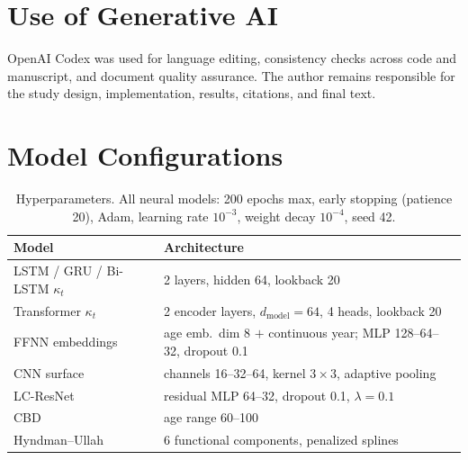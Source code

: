 \documentclass[11pt,a4paper]{article}
\begin{document}
\section*{Use of Generative AI}
OpenAI Codex was used for language editing, consistency checks across code and manuscript, and document quality assurance. The author remains responsible for the study design, implementation, results, citations, and final text.




\appendix

\section{Model Configurations}
\label{app:configs}

\begin{table}[htbp]
\centering
\caption{Hyperparameters. All neural models: 200 epochs max, early stopping (patience 20), Adam, learning rate $10^{-3}$, weight decay $10^{-4}$, seed 42.}
\label{tab:hyper}
\small
\begin{tabular}{l l}
\toprule
Model & Architecture \\
\midrule
LSTM / GRU / Bi-LSTM $\kappa_t$ & 2 layers, hidden 64, lookback 20 \\
Transformer $\kappa_t$ & 2 encoder layers, $d_{\text{model}}{=}64$, 4 heads, lookback 20 \\
FFNN embeddings & age emb.\ dim 8 $+$ continuous year; MLP 128--64--32, dropout 0.1 \\
CNN surface & channels 16--32--64, kernel $3{\times}3$, adaptive pooling \\
LC-ResNet & residual MLP 64--32, dropout 0.1, $\lambda = 0.1$ \\
CBD & age range 60--100 \\
Hyndman--Ullah & 6 functional components, penalized splines \\
\bottomrule
\end{tabular}
\end{table}
\end{document}
